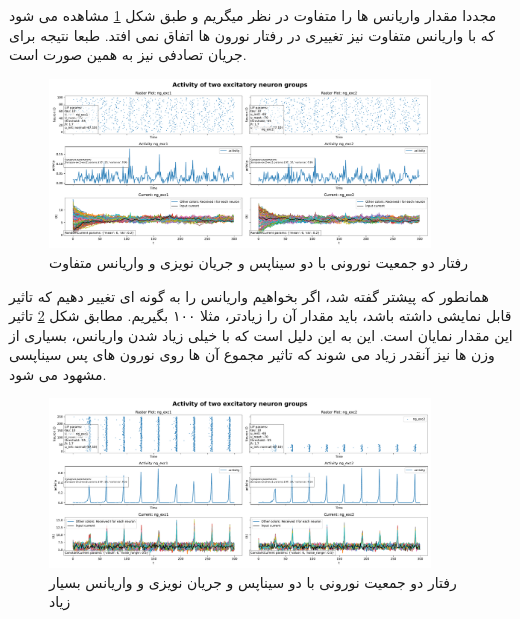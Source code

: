             مجددا مقدار واریانس ها را متفاوت در نظر میگریم و طبق شکل
            \ref{fig:part2-two-ng-full-synapse-diff-variance-rand-curr}
            مشاهده می شود که با واریانس متفاوت نیز تغییری در رفتار نورون ها اتفاق نمی افتد. طبعا نتیجه برای جریان تصادفی نیز به همین صورت است.
            \begin{figure}[!ht]
                \centering
                \includegraphics[width=0.9\textwidth]{plots/part2-two-ng-full-synapse-diff-variance-rand-curr.pdf} 
                \caption{رفتار دو جمعیت نورونی با دو سیناپس و جریان نویزی و واریانس متفاوت}
                \label{fig:part2-two-ng-full-synapse-diff-variance-rand-curr}
            \end{figure}
            همانطور که پیشتر گفته شد، اگر بخواهیم واریانس را به گونه ای تغییر دهیم که تاثیر قابل نمایشی داشته باشد، باید مقدار آن را زیادتر، مثلا ۱۰۰ بگیریم. مطابق شکل 
            \ref{fig:part2-two-ng-full-synapse-very-high-variance-noise-curr}
            تاثیر این مقدار نمایان است. این به این دلیل است که با خیلی زیاد شدن واریانس، بسیاری از وزن ها نیز آنقدر زیاد می شوند که تاثیر مجموع آن ها روی نورون های پس سیناپسی مشهود می شود.
            \begin{figure}[!ht]
                \centering
                \includegraphics[width=0.9\textwidth]{plots/part2-two-ng-full-synapse-very-high-variance-noise-curr.pdf} 
                \caption{رفتار دو جمعیت نورونی با دو سیناپس و جریان نویزی و واریانس بسیار زیاد}
                \label{fig:part2-two-ng-full-synapse-very-high-variance-noise-curr}
            \end{figure}
            
